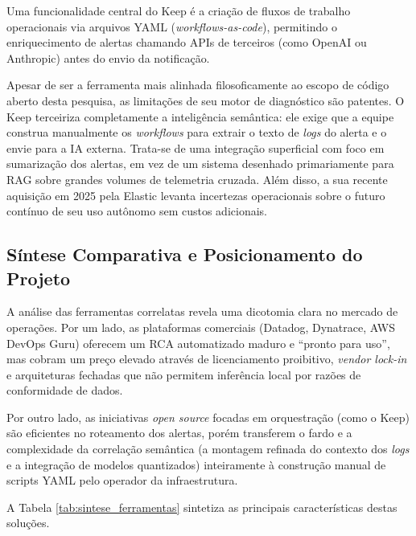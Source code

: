 Uma funcionalidade central do Keep é a criação de fluxos de trabalho operacionais via arquivos YAML (\textit{workflows-as-code}), permitindo o enriquecimento de alertas chamando APIs de terceiros (como OpenAI ou Anthropic) antes do envio da notificação. 

Apesar de ser a ferramenta mais alinhada filosoficamente ao escopo de código aberto desta pesquisa, as limitações de seu motor de diagnóstico são patentes. O Keep terceiriza completamente a inteligência semântica: ele exige que a equipe construa manualmente os \textit{workflows} para extrair o texto de \textit{logs} do alerta e o envie para a IA externa. Trata-se de uma integração superficial com foco em sumarização dos alertas, em vez de um sistema desenhado primariamente para RAG sobre grandes volumes de telemetria cruzada. Além disso, a sua recente aquisição em 2025 pela Elastic levanta incertezas operacionais sobre o futuro contínuo de seu uso autônomo sem custos adicionais.

\subsection{Síntese Comparativa e Posicionamento do Projeto}

A análise das ferramentas correlatas revela uma dicotomia clara no mercado de operações. Por um lado, as plataformas comerciais (Datadog, Dynatrace, AWS DevOps Guru) oferecem um RCA automatizado maduro e ``pronto para uso'', mas cobram um preço elevado através de licenciamento proibitivo, \textit{vendor lock-in} e arquiteturas fechadas que não permitem inferência local por razões de conformidade de dados.

Por outro lado, as iniciativas \textit{open source} focadas em orquestração (como o Keep) são eficientes no roteamento dos alertas, porém transferem o fardo e a complexidade da correlação semântica (a montagem refinada do contexto dos \textit{logs} e a integração de modelos quantizados) inteiramente à construção manual de scripts YAML pelo operador da infraestrutura.

A Tabela \ref{tab:sintese_ferramentas} sintetiza as principais características destas soluções.

